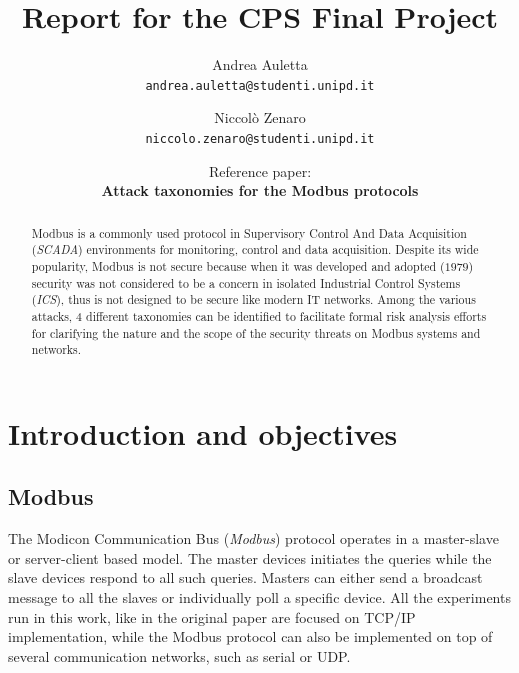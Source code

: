 \documentclass[12pt]{article}
\title{Report for the CPS Final Project}
\author{
    Andrea Auletta \\ \texttt{andrea.auletta@studenti.unipd.it} \and
    Niccolò Zenaro \\ \texttt{niccolo.zenaro@studenti.unipd.it} \and 
    Reference paper: \\ \textbf{Attack taxonomies for the Modbus protocols} \cite{huitsing2008attack}
}
\begin{document}
\maketitle
\newpage
\tableofcontents
\newpage

\begin{abstract}
Modbus is a commonly used protocol in Supervisory Control And Data Acquisition (\textit{SCADA}) environments
for monitoring, control and data acquisition. Despite its wide popularity, Modbus is not secure because when it was developed and adopted ($1979$) security was not considered to be a concern in isolated Industrial Control Systems (\textit{ICS}), thus is not designed to be secure like modern IT networks.
Among the various attacks, 4 different taxonomies can be identified to facilitate formal risk analysis efforts for clarifying the nature and the scope of the security threats on Modbus systems and networks.
\end{abstract}

\section{Introduction and objectives}
\subsection{Modbus}
The Modicon Communication Bus (\textit{Modbus}) protocol operates in a master-slave or server-client based model. The master devices initiates the queries while the slave devices respond to all such queries.
Masters can either send a broadcast message to all the slaves or individually poll a specific device. 
All the experiments run in this work, like in the original paper \cite{huitsing2008attack} are focused on TCP/IP implementation, while the Modbus protocol 
can also be implemented on top of several communication networks, such as serial or UDP. 
\end{document}
